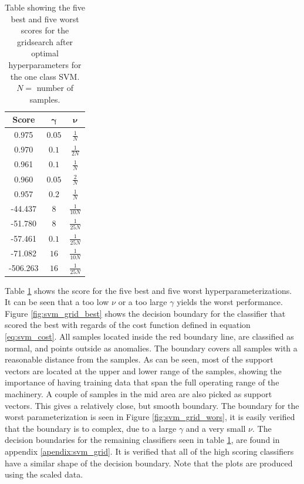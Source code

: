                 \begin{table}[h]
                    \centering
                    \begin{tabular}{ccc}
                        \toprule
                         \textbf{Score}  &   $\bm \gamma$    & $\bm \nu$         \\ \midrule
                         0.975  &   $0.05$      & $\frac{1}{N}$ \\ 
                         0.970  &   $0.1$      & $\frac{1}{2N}$ \\ 
                         0.961  &   $0.1$      & $\frac{1}{N}$ \\ 
                         0.960  &   $0.05$      & $\frac{2}{N}$ \\ 
                         0.957  &   $0.2$       & $\frac{1}{N}$ \\ 
                         -44.437  &   $8$      & $\frac{1}{10N}$ \\ 
                         -51.780  &   $8$      & $\frac{1}{25N}$ \\ 
                         -57.461  &   $0.1$      & $\frac{1}{25N}$ \\
                         -71.082  &   $16$      & $\frac{1}{10N}$ \\ 
                         -506.263  &   $16$      & $\frac{1}{25N}$ \\ \bottomrule
                         
                    \end{tabular}
                    \caption{Table showing the five best and five worst scores for the gridsearch after optimal hyperparameters for the one class SVM. $N = $ number of samples.}
                    \label{tab:svm_gridsearch}
                \end{table}
                
                Table \ref{tab:svm_gridsearch} shows the score for the five best and five worst hyperparameterizations. It can be seen that a too low $\nu$ or a too large $\gamma$ yields the worst performance. Figure \ref{fig:svm_grid_best} shows the decision boundary for the classifier that scored the best with regards of the cost function defined in equation \ref{eq:svm_cost}. All samples located inside the red boundary line, are classified as normal, and points outside as anomalies. The boundary covers all samples with a reasonable distance from the samples. As can be seen, most of the support vectors are located at the upper and lower range of the samples, showing the importance of having training data that span the full operating range of the machinery. A couple of samples in the mid area are also picked as support vectors. This gives a relatively close, but smooth boundary. The boundary for the worst parameterization is seen in Figure \ref{fig:svm_grid_wors}, it is easily verified that the boundary is to complex, due to a large $\gamma$ and a very small $\nu$. The decision boundaries for the remaining classifiers seen in table \ref{tab:svm_gridsearch}, are found in appendix \ref{apendix:svm_grid}. It is verified that all of the high scoring classifiers have a similar shape of the decision boundary. Note that the plots are produced using the scaled data. 
                
